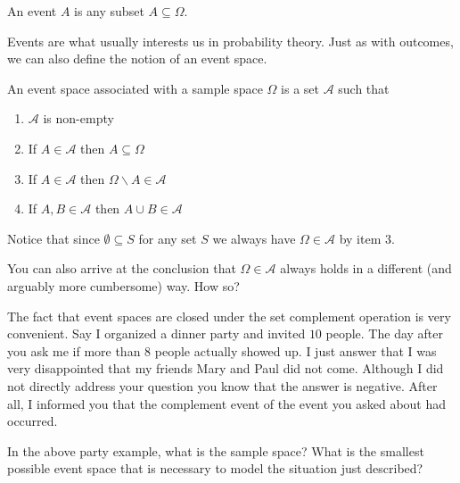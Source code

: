 \begin{Definition} 
An event $ A $ is any subset $ A \subseteq \Omega $.
\end{Definition}

Events are what usually interests us in probability theory. Just as with outcomes, we can 
also define the notion of an event space.

\newpage
\begin{Definition} 
An event space associated with a sample space $ \Omega $ is a set $ \mathcal{A} $ such that
\begin{enumerate}
\item $ \mathcal{A} $ is non-empty
\item If $ A \in \mathcal{A} $ then $ A \subseteq \Omega $
\item If $ A \in \mathcal{A} $ then $ \Omega\backslash A \in \mathcal{A} $
\item If $ A,B \in \mathcal{A} $ then $ A \cup B \in \mathcal{A} $
\end{enumerate}
\end{Definition}

Notice that since $ \emptyset \subseteq S $ for any set $ S $ we always have $ \Omega \in \mathcal{A} $
by item 3.

\begin{Exercise} 
You can also arrive at the conclusion that $ \Omega \in \mathcal{A} $ always holds in a 
different (and arguably more cumbersome) way. How so?
\end{Exercise}

The fact that event spaces are closed under the set complement operation is very convenient. Say I
organized a dinner party and invited $ 10 $ people. The day after you ask me if more than $ 8 $ people
actually showed up. I just answer that I was very disappointed that my friends Mary and Paul did 
not come. Although I did not directly address your question you know that the answer is negative. After
all, I informed you that the complement event of the event you asked about had occurred.

\begin{Exercise} 
In the above party example, what is the sample space? What is the smallest possible event space that is necessary to
model the situation just described?
\end{Exercise}

